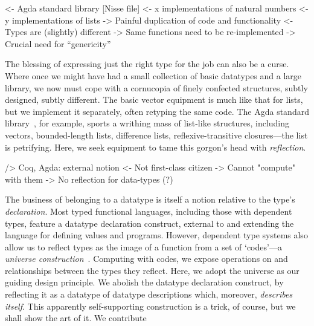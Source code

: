 \documentclass[authoryear]{sigplanconf}
\newenvironment{wstructure}{\comment}{\endcomment}
\begin{document}

\begin{wstructure}
    <- Agda standard library [Nisse file]
        <- x implementations of natural numbers
        <- y implementations of lists
        -> Painful duplication of code and functionality
            <- Types are (slightly) different
                -> Same functions need to be re-implemented 
        -> Crucial need for ``genericity''
\end{wstructure}

The blessing of expressing just the right type for the job can also be
a curse. Where once we might have had a small collection of basic
datatypes and a large library, we now must cope with a cornucopia of
finely confected structures, subtly designed, subtly different. The
basic vector equipment is much like that for lists, but we implement
it separately, often retyping the same code. The Agda standard
library~\cite{nisse:asl}, for example, sports a writhing mass of
list-like structures, including vectors, bounded-length lists,
difference lists, reflexive-transitive closures---the list is
petrifying. Here, we seek equipment to tame this gorgon's head with
\emph{reflection}.

\begin{wstructure}
        /> Coq, Agda: external notion
            <- Not first-class citizen
            -> Cannot "compute" with them
            -> No reflection for data-types (?)
\end{wstructure}

The business of belonging to a datatype is itself a notion
relative to the type's \emph{declaration}. Most typed functional
languages, including those with dependent types, feature a datatype
declaration construct, external to and extending the language for
defining values and programs. However, dependent type systems also
allow us to reflect types as the image of a function from a set of
`codes'---a \emph{universe construction}~\cite{martin-lof:itt}. 
Computing with codes, we expose operations on and
relationships between the types they reflect. Here, we adopt
the universe as our guiding design principle. We abolish the
datatype declaration construct, by reflecting it as a datatype of
datatype descriptions which, moreover, \emph{describes itself}. This
apparently self-supporting construction is a trick, of course, but
we shall show the art of it. We contribute
\end{document}

